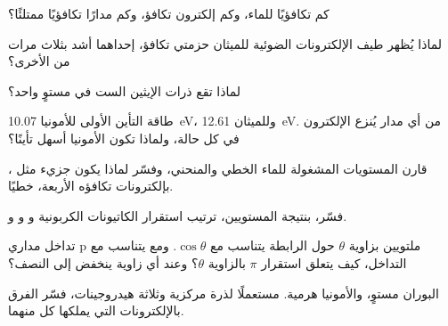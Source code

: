 \begin{exercise}[$\star$]\label{exo:b2:fragment-orbitals:2}
كم  تكافؤيًا للماء، وكم إلكترون تكافؤ،
وكم مدارًا تكافؤيًا ممتلئًا؟
\end{exercise}

\begin{exercise}[$\star$]\label{exo:b2:fragment-orbitals:3}
لماذا يُظهر طيف الإلكترونات الضوئية للميثان حزمتي تكافؤ، إحداهما
أشد بثلاث مرات من الأخرى؟
\end{exercise}

\begin{exercise}[$\star$]\label{exo:b2:fragment-orbitals:4}
لماذا تقع ذرات الإيثين الست في مستوٍ واحد؟
\end{exercise}

\begin{exercise}[$\star\star$]\label{exo:b2:fragment-orbitals:5}
طاقة التأين الأولى للأمونيا \qty{10.07}{eV}، وللميثان
\qty{12.61}{eV}. من أي مدار يُنزع الإلكترون في كل حالة، ولماذا تكون الأمونيا
أسهل تأينًا؟
\end{exercise}

\begin{exercise}[$\star\star$]\label{exo:b2:fragment-orbitals:6}
قارن المستويات المشغولة للماء الخطي والمنحني، وفسّر لماذا يكون جزيء
مثل ، بإلكترونات تكافؤه الأربعة، خطيًا.
\end{exercise}

\begin{exercise}[$\star\star$]\label{exo:b2:fragment-orbitals:7}
فسّر، بنتيجة المستويين، ترتيب استقرار الكاتيونات الكربونية
 و و و.
\end{exercise}

\begin{exercise}[$\star\star$]\label{exo:b2:fragment-orbitals:8}
تداخل مداري p ملتويين بزاوية $\theta$ حول الرابطة
يتناسب مع $\cos\theta$. ومع  يتناسب مع
التداخل، كيف يتعلق استقرار $\pi$ بالزاوية $\theta$؟ وعند أي زاوية
ينخفض إلى النصف؟
\end{exercise}

\begin{exercise}[$\star\star$]\label{exo:b2:fragment-orbitals:9}
البوران  مستوٍ، والأمونيا هرمية. مستعملًا  لذرة
مركزية وثلاثة هيدروجينات، فسّر الفرق بالإلكترونات التي يملكها كل منهما.
\end{exercise}

